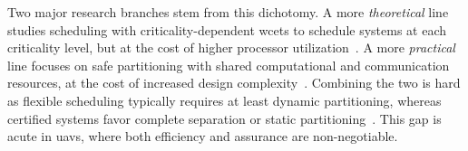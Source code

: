 Two major research branches stem from this dichotomy. A more \emph{theoretical}
line studies scheduling with criticality-dependent \glspl{wcet} to schedule
systems at each criticality level, but at the cost of higher processor utilization~\cite{lee_estimating_2023}. A more \emph{practical}
line focuses on safe partitioning with shared computational and communication
resources, at the cost of increased design complexity~\cite{cinque2022virtualizing}. Combining the two is
hard as flexible scheduling typically requires at least dynamic partitioning,
whereas certified systems favor complete separation or static
partitioning~\cite{burns2022mixed}. This gap is acute in \glspl{uav}, where both
efficiency and assurance are non-negotiable.




